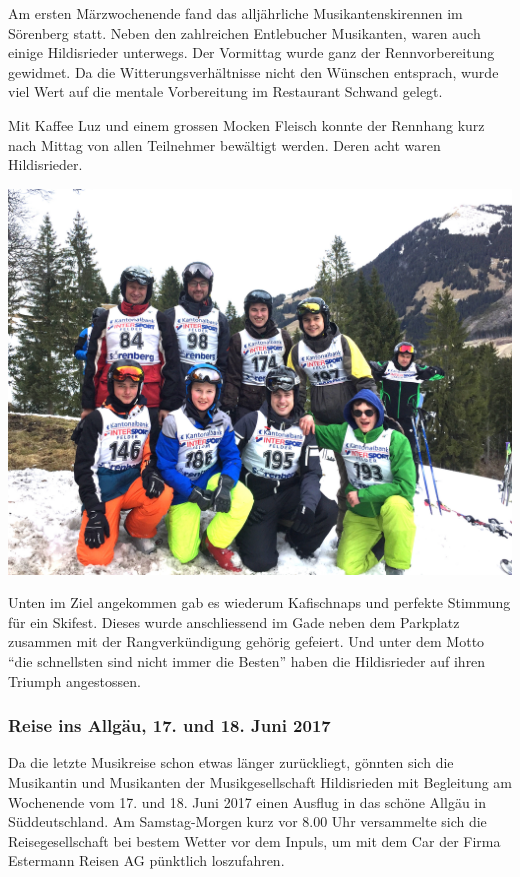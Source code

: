 \begin{history}

    Am ersten Märzwochenende fand das alljährliche Musikantenskirennen im
    Sörenberg statt. Neben den zahlreichen Entlebucher Musikanten, waren auch
    einige Hildisrieder unterwegs. Der Vormittag wurde ganz der Rennvorbereitung
    gewidmet. Da die Witterungsverhältnisse nicht den Wünschen entsprach, wurde
    viel Wert auf die mentale Vorbereitung im Restaurant Schwand gelegt.

    Mit Kaffee Luz und einem grossen Mocken Fleisch konnte der Rennhang kurz
    nach Mittag von allen Teilnehmer bewältigt werden. Deren acht waren
    Hildisrieder.

    \begin{MulticolFigure}
        \centering
        \includegraphics[width=0.93\linewidth]{./chap/2001-2024/2017/Skirennen-2017.jpg}
    \end{MulticolFigure}

    Unten im Ziel angekommen gab es wiederum Kafischnaps und perfekte Stimmung
    für ein Skifest. Dieses wurde anschliessend im Gade neben dem Parkplatz
    zusammen mit der Rangverkündigung gehörig gefeiert. Und unter dem Motto
    \enquote{die schnellsten sind nicht immer die Besten} haben die Hildisrieder
    auf ihren Triumph angestossen.


    \subsubsection*{Reise ins Allgäu, 17. und 18. Juni 2017}

    Da die letzte Musikreise schon etwas länger zurückliegt, gönnten sich die
    Musikantin und Musikanten der Musikgesellschaft Hildisrieden mit Begleitung
    am Wochenende vom 17. und 18. Juni 2017 einen Ausflug in das schöne Allgäu
    in Süddeutschland. Am Samstag-Morgen kurz vor 8.00 Uhr versammelte sich die
    Reisegesellschaft bei bestem Wetter vor dem Inpuls, um mit dem Car der Firma
    Estermann Reisen AG pünktlich loszufahren.


\end{history}
